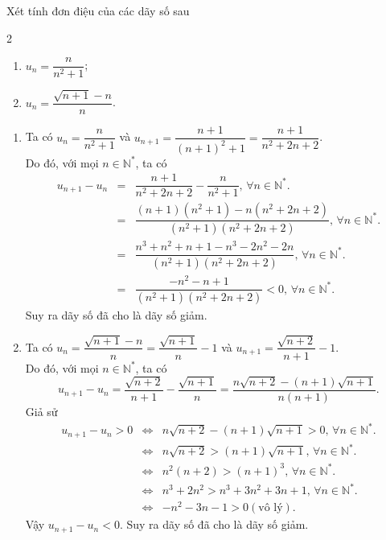 \begin{bt}%
	Xét tính đơn điệu của các dãy số sau
	\begin{multicols}{2}
		\begin{enumerate}
			\item $u_n=\dfrac{n}{n^2+1}$;
			\item $u_n=\dfrac{\sqrt{n+1}-n}{n}$.
		\end{enumerate}
	\end{multicols}
	\loigiai 
	{
		\begin{enumerate}
			\item Ta có $u_n=\dfrac{n}{n^2+1}$ và $u_{n+1}=\dfrac{n+1}{(n+1)^2+1}=\dfrac{n+1}{n^2+2n+2}$.\\
			Do đó, với mọi $n\in \mathbb{N}^*$, ta có 
			\allowdisplaybreaks
			\begin{eqnarray*}
				u_{n+1}-u_n&=&\dfrac{n+1}{n^2+2n+2}-\dfrac{n}{n^2+1},\,\forall n\in \mathbb{N}^*.\\
				&=&\dfrac{(n+1)(n^2+1)-n(n^2+2n+2)}{(n^2+1)(n^2+2n+2)},\,\forall n\in \mathbb{N}^*.\\
				&=&\dfrac{n^3+n^2+n+1-n^3-2n^2-2n}{(n^2+1)(n^2+2n+2)},\,\forall n\in \mathbb{N}^*.\\
				&=&\dfrac{-n^2-n+1}{(n^2+1)(n^2+2n+2)}<0,\,\forall n\in \mathbb{N}^*.
			\end{eqnarray*}
			Suy ra dãy số đã cho là dãy số giảm.
			\item Ta có $u_n=\dfrac{\sqrt{n+1}-n}{n}=\dfrac{\sqrt{n+1}}{n}-1$ và $u_{n+1}=\dfrac{\sqrt{n+2}}{n+1}-1$.\\
			Do đó, với mọi $n\in \mathbb{N}^*$, ta có $$u_{n+1}-u_n=\dfrac{\sqrt{n+2}}{n+1}-\dfrac{\sqrt{n+1}}{n}=\dfrac{n\sqrt{n+2}-(n+1)\sqrt{n+1}}{n(n+1)}.$$
			Giả sử \allowdisplaybreaks
			\begin{eqnarray*}
				u_{n+1}-u_n>0&\Leftrightarrow&n\sqrt{n+2}-(n+1)\sqrt{n+1}>0,\,\forall n\in \mathbb{N}^*.\\
				&\Leftrightarrow&n\sqrt{n+2}>(n+1)\sqrt{n+1},\,\forall n\in \mathbb{N}^*.\\
				&\Leftrightarrow&n^2(n+2)>(n+1)^3,\,\forall n\in \mathbb{N}^*.\\
				&\Leftrightarrow&n^3+2n^2>n^3+3n^2+3n+1,\,\forall n\in \mathbb{N}^*.\\
				&\Leftrightarrow&-n^2-3n-1>0 (\text{vô lý}).
			\end{eqnarray*}
			Vậy $u_{n+1}-u_n<0$. Suy ra dãy số đã cho là dãy số giảm.
		\end{enumerate}
	}
\end{bt}

